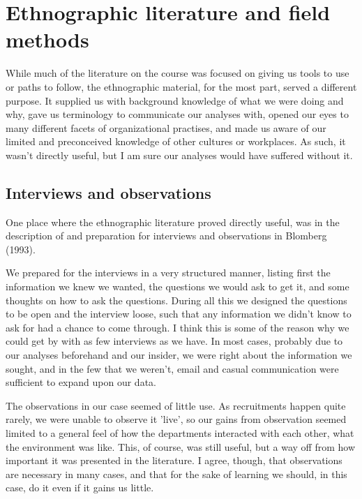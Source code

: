 \section{Ethnographic literature and field methods}
While much of the literature on the course was focused on giving us tools to use or paths to follow, the ethnographic material, for the most part, served a different purpose.
It supplied us with background knowledge of what we were doing and why, gave us terminology to communicate our analyses with, opened our eyes to many different facets of organizational practises, and made us aware of our limited and preconceived knowledge of other cultures or workplaces.
As such, it wasn't directly useful, but I am sure our analyses would have suffered without it.

\subsection{Interviews and observations}
One place where the ethnographic literature proved directly useful, was in the description of and preparation for interviews and observations in Blomberg (1993).

We prepared for the interviews in a very structured manner, listing first the information we knew we wanted, the questions we would ask to get it, and some thoughts on how to ask the questions.
During all this we designed the questions to be open and the interview loose, such that any information we didn't know to ask for had a chance to come through.
I think this is some of the reason why we could get by with as few interviews as we have. 
In most cases, probably due to our analyses beforehand and our insider, we were right about the information we sought, and in the few that we weren't, email and casual communication were sufficient to expand upon our data.

The observations in our case seemed of little use.
As recruitments happen quite rarely, we were unable to observe it 'live', so our gains from observation seemed limited to a general feel of how the departments interacted with each other, what the environment was like.
This, of course, was still useful, but a way off from how important it was presented in the literature.
I agree, though, that observations are necessary in many cases, and that for the sake of learning we should, in this case, do it even if it gains us little.